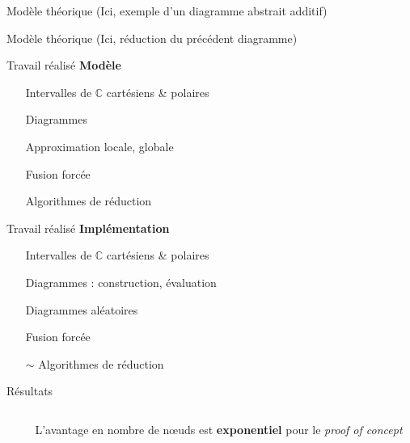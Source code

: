 \documentclass[french, 12pt]{beamer}
\begin{document}
\begin{frame}{Modèle théorique}
    \Huge{(Ici, exemple d'un diagramme abstrait additif)}
\end{frame}

\begin{frame}{Modèle théorique}
    \Huge{(Ici, réduction du précédent diagramme)}
\end{frame}

\begin{frame}{Travail réalisé}
\textbf{Modèle}
\begin{itemize}
    \item[\checkmark] Intervalles de $\mathbb C$ cartésiens \& polaires
    \item[\checkmark] Diagrammes
    \item[\checkmark] Approximation locale, globale
    \item[\checkmark] Fusion forcée
    \item[\checkmark] Algorithmes de réduction
\end{itemize}
\end{frame}

\begin{frame}{Travail réalisé}
    \textbf{Implémentation}
    \begin{itemize}
        \item[\checkmark] Intervalles de $\mathbb C$ cartésiens \& polaires
        \item[\checkmark] Diagrammes : construction, évaluation
        \item[\checkmark] Diagrammes aléatoires
        \item[\checkmark] Fusion forcée
        \item[$\sim$] Algorithmes de réduction
    \end{itemize}
\end{frame}

\begin{frame}{Résultats}
    \begin{columns}
        \begin{column}{0.6\textwidth}
                \end{column}
        \begin{column}{0.4\textwidth}
            L'avantage en nombre de nœuds est \textbf{exponentiel} pour le \textit{proof of concept}
        \end{column}
    \end{columns}
\end{frame}
\end{document}
